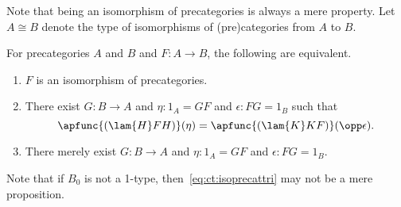 Note that being an isomorphism of precategories is always a mere property.
Let $A\cong B$ denote the type of isomorphisms of (pre)categories from $A$ to $B$.

\begin{lem}\label{ct:isoprecat}
  For precategories $A$ and $B$ and $F:A\to B$, the following are equivalent.
  \begin{enumerate}
  \item $F$ is an isomorphism of precategories.\label{item:ct:ipc1}
  \item There exist $G:B\to A$ and $\eta:1_A = GF$ and $\epsilon:FG=1_B$ such that\label{item:ct:ipc2}
    \begin{equation}
      \apfunc{(\lam{H} F H)}({\eta}) = \apfunc{(\lam{K} K F)}({\opp\epsilon}).\label{eq:ct:isoprecattri}
    \end{equation}
  \item There merely exist $G:B\to A$ and $\eta:1_A = GF$ and $\epsilon:FG=1_B$.\label{item:ct:ipc3}
  \end{enumerate}
\end{lem}

Note that if $B_0$ is not a 1-type, then~\eqref{eq:ct:isoprecattri} may not be a mere proposition.

